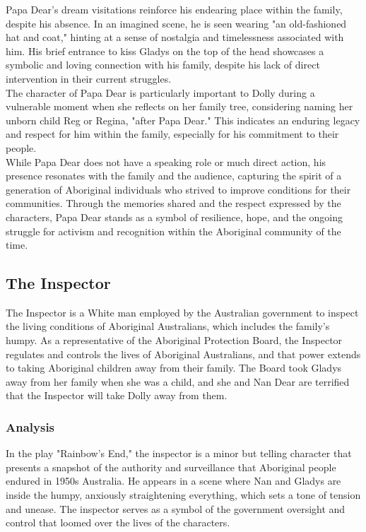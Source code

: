 \documentclass[a4paper]{article}
\begin{document}
Papa Dear's dream visitations reinforce his endearing place within the family, despite his absence. 
In an imagined scene, he is seen wearing "an old-fashioned hat and coat," hinting at a sense of 
nostalgia and timelessness associated with him. His brief entrance to kiss Gladys on the top of the 
head showcases a symbolic and loving connection with his family, despite his lack of direct 
intervention in their current struggles.\\

The character of Papa Dear is particularly important to Dolly during a vulnerable moment when she 
reflects on her family tree, considering naming her unborn child Reg or Regina, "after Papa Dear." 
This indicates an enduring legacy and respect for him within the family, especially for his 
commitment to their people.\\

While Papa Dear does not have a speaking role or much direct action, his presence resonates with 
the family and the audience, capturing the spirit of a generation of Aboriginal individuals who 
strived to improve conditions for their communities. Through the memories shared and the respect 
expressed by the characters, Papa Dear stands as a symbol of resilience, hope, and the ongoing 
struggle for activism and recognition within the
Aboriginal community of the time.



\subsection{The Inspector}
The Inspector is a White man employed by the
Australian government to inspect the living conditions of
Aboriginal Australians, which includes the family’s humpy. As a
representative of the Aboriginal Protection Board, the
Inspector regulates and controls the lives of Aboriginal
Australians, and that power extends to taking Aboriginal
children away from their family. The Board took Gladys away
from her family when she was a child, and she and Nan Dear
are terrified that the Inspector will take Dolly away from them.\\

\subsubsection{Analysis}
In the play "Rainbow's End," the inspector is a minor but telling character that presents a 
snapshot of the authority and surveillance that Aboriginal people endured in 1950s Australia. He 
appears in a scene where Nan and Gladys are inside the humpy, anxiously straightening everything, 
which sets a tone of tension and unease. The inspector serves as a symbol of the government 
oversight and control that loomed over the lives of the characters.\\
\end{document}

